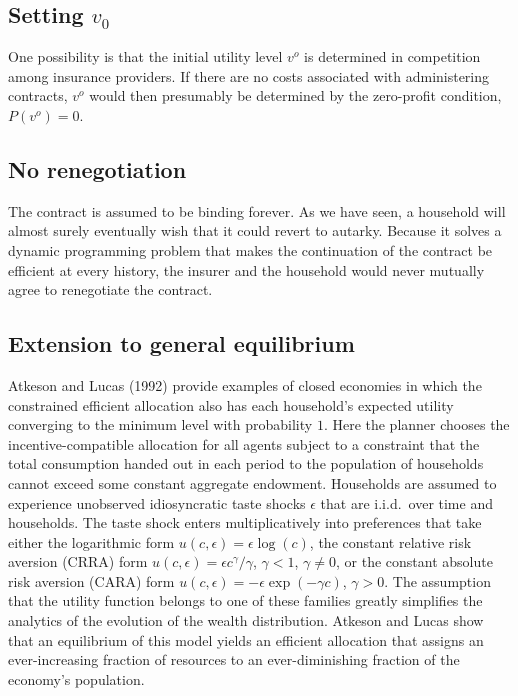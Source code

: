 \subsection{Setting $v_0$}

One possibility is that the initial utility level $v^o$
is determined in competition among insurance
providers. If there are no costs associated with
administering contracts, $v^o$ would then presumably  be  determined
by the zero-profit condition, $P(v^o)=0$. 


\subsection{No renegotiation}
The contract is assumed to be binding forever.
As we have seen,
a household will almost surely eventually wish that it could  revert  to autarky. Because it 
solves a dynamic programming
problem that makes  the continuation of the contract be efficient
at every history, the insurer and
the household would never mutually agree to renegotiate the contract.
\subsection{Extension to general equilibrium}
Atkeson and Lucas (1992)
provide examples of closed economies in which the constrained
efficient allocation also has each household's expected utility
converging to the minimum level with probability $1$. Here the
planner chooses the incentive-compatible allocation for all agents
subject to a constraint that the total consumption handed out in
each period to the population of households cannot exceed some
constant aggregate endowment. Households are assumed to experience
unobserved idiosyncratic taste shocks $ \epsilon$ that are i.i.d.\
over time and households. The taste shock enters multiplicatively
into preferences that take either the logarithmic form
$u(c,\epsilon)=\epsilon \log (c)$, the constant relative risk aversion
 (CRRA) form $u(c,\epsilon) = \epsilon c^{\gamma}/\gamma$,
$\gamma<1$, $\gamma \not= 0$, or the constant absolute risk
aversion (CARA) form $u(c,\epsilon) = -\epsilon \exp (-\gamma c)$,
$\gamma>0$. The assumption that the  utility function belongs to
one of these families greatly simplifies the analytics of the
evolution of the wealth distribution.
Atkeson and Lucas show that an equilibrium  of this model yields an efficient
allocation that assigns an ever-increasing fraction of resources to an
ever-diminishing fraction of the economy's population.


